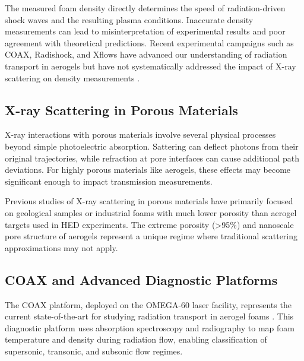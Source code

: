 \documentclass[twocolumn]{aastex701}
\begin{document}
The measured foam density directly determines the speed of radiation-driven shock waves and the resulting plasma conditions. Inaccurate density measurements can lead to misinterpretation of experimental results and poor agreement with theoretical predictions. Recent experimental campaigns such as COAX, Radishock, and Xflows have advanced our understanding of radiation transport in aerogels but have not systematically addressed the impact of X-ray scattering on density measurements \citep{Byvank_Coffing_Lioce_Fryer_Fontes_Kozlowski_Johns_Čamdžić_Elshafiey_Meyerhofer_et_al._2024, Fryer_Wood_Coffing_Robey_Fontes_Johns_Kozlowski_Urbatsch_Lanier_Meyerhofer_et_al._2023}.

\subsection{X-ray Scattering in Porous Materials}
X-ray interactions with porous materials involve several physical processes beyond simple photoelectric absorption. Sattering can deflect photons from their original trajectories, while refraction at pore interfaces can cause additional path deviations. For highly porous materials like aerogels, these effects may become significant enough to impact transmission measurements.

Previous studies of X-ray scattering in porous materials have primarily focused on geological samples or industrial foams with much lower porosity than aerogel targets used in HED experiments. The extreme porosity (>95$\%$) and nanoscale pore structure of aerogels represent a unique regime where traditional scattering approximations may not apply.

\subsection{COAX and Advanced Diagnostic Platforms}

The COAX platform, deployed on the OMEGA-60 laser facility, represents the current state-of-the-art for studying radiation transport in aerogel foams \citep{Byvank_Coffing_Lioce_Fryer_Fontes_Kozlowski_Johns_Čamdžić_Elshafiey_Meyerhofer_et_al._2024}. This diagnostic platform uses absorption spectroscopy and radiography to map foam temperature and density during radiation flow, enabling classification of supersonic, transonic, and subsonic flow regimes.
\end{document}
